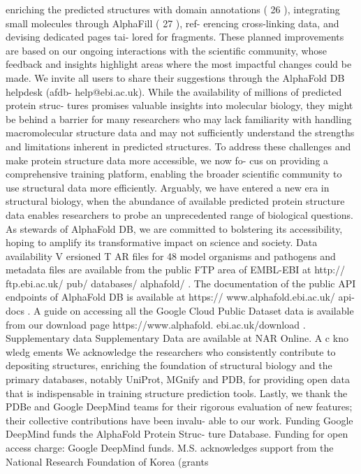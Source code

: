 enriching the predicted structures with domain annotations
( 26 ), integrating small molecules through AlphaFill ( 27 ), ref-
erencing cross-linking data, and devising dedicated pages tai-
lored for fragments. These planned improvements are based
on our ongoing interactions with the scientific community,
whose feedback and insights highlight areas where the most
impactful changes could be made. We invite all users to share
their suggestions through the AlphaFold DB helpdesk (afdb-
help@ebi.ac.uk).
While the availability of millions of predicted protein struc-
tures promises valuable insights into molecular biology, they
might be behind a barrier for many researchers who may lack
familiarity with handling macromolecular structure data and
may not sufficiently understand the strengths and limitations
inherent in predicted structures. To address these challenges
and make protein structure data more accessible, we now fo-
cus on providing a comprehensive training platform, enabling
the broader scientific community to use structural data more
efficiently.
Arguably, we have entered a new era in structural biology,
when the abundance of available predicted protein structure
data enables researchers to probe an unprecedented range of
biological questions. As stewards of AlphaFold DB, we are
committed to bolstering its accessibility, hoping to amplify its
transformative impact on science and society.
Data availability
V ersioned T AR files for 48 model organisms and pathogens
and metadata files are available from the public FTP area of
EMBL-EBI at http:// ftp.ebi.ac.uk/ pub/ databases/ alphafold/ .
The documentation of the public API endpoints of AlphaFold
DB is available at https:// www.alphafold.ebi.ac.uk/ api-docs .
A guide on accessing all the Google Cloud Public Dataset data
is available from our download page https://www.alphafold.
ebi.ac.uk/download .
Supplementary data
Supplementary Data are available at NAR Online.
A c kno wledg ements
We acknowledge the researchers who consistently contribute
to depositing structures, enriching the foundation of structural
biology and the primary databases, notably UniProt, MGnify
and PDB, for providing open data that is indispensable in
training structure prediction tools. Lastly, we thank the PDBe
and Google DeepMind teams for their rigorous evaluation of
new features; their collective contributions have been invalu-
able to our work.
Funding
Google DeepMind funds the AlphaFold Protein Struc-
ture Database. Funding for open access charge: Google
DeepMind funds. M.S. acknowledges support from
the National Research Foundation of Korea (grants
